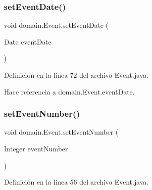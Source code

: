 \subsubsection{\texorpdfstring{setEventDate()}{setEventDate()}}
{\footnotesize\ttfamily void domain.\+Event.\+set\+Event\+Date (\begin{DoxyParamCaption}\item[{Date}]{event\+Date }\end{DoxyParamCaption})}



Definición en la línea 72 del archivo Event.\+java.


\begin{DoxyCode}{0}

\end{DoxyCode}


Hace referencia a domain.\+Event.\+event\+Date.

\mbox{\label{classdomain_1_1Event_ace19804912ce14a756e677a394c29fe5}} 
\subsubsection{\texorpdfstring{setEventNumber()}{setEventNumber()}}
{\footnotesize\ttfamily void domain.\+Event.\+set\+Event\+Number (\begin{DoxyParamCaption}\item[{Integer}]{event\+Number }\end{DoxyParamCaption})}



Definición en la línea 56 del archivo Event.\+java.


\begin{DoxyCode}{0}

\end{DoxyCode}


